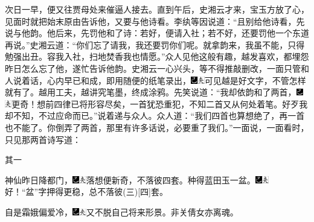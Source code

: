 次日一早，便又往贾母处来催逼人接去。直到午后，史湘云才来，宝玉方放了心，见面时就把始末原由告诉他，又要与他诗看。李纨等因说道：``且别给他诗看，先说与他韵。他后来，先罚他和了诗：若好，便请入社；若不好，还要罚他一个东道再说。''史湘云道：``你们忘了请我，我还要罚你们呢。就拿韵来，我虽不能，只得勉强出丑。容我入社，扫地焚香我也情愿。''众人见他这般有趣，越发喜欢，都埋怨昨日怎么忘了他，遂忙告诉他韵。史湘云一心兴头，等不得推敲删改，一面只管和人说着话，心内早已和成，即用随便的纸笔录出，{\includegraphics[width=3mm]{../Images/00003}\includegraphics[width=3mm]{../Images/00012}\footnotesize \kaishu 可见越是好文字，不管怎样就有了。越用工夫，越讲究笔墨，终成涂鸦。}先笑说道：``我却依韵和了两首，{\includegraphics[width=3mm]{../Images/00003}\includegraphics[width=3mm]{../Images/00012}\footnotesize \kaishu 更奇！想前四律已将形容尽矣，一首犹恐重犯，不知二首又从何处着笔。}好歹我却不知，不过应命而已。''说着递与众人。众人道：``我们四首也算想绝了，再一首也不能了。你倒弄了两首，那里有许多话说，必要重了我们。''一面说，一面看时，只见那两首诗写道：

其一

神仙昨日降都门，{\includegraphics[width=3mm]{../Images/00003}\includegraphics[width=3mm]{../Images/00012}\footnotesize \kaishu 落想便新奇，不落彼四套。}种得蓝田玉一盆。{\includegraphics[width=3mm]{../Images/00003}\includegraphics[width=3mm]{../Images/00012}\footnotesize \kaishu 好！``盆''字押得更稳，总不落彼{(三)}{[}四{]}套。}

自是霜娥偏爱冷，{\includegraphics[width=3mm]{../Images/00003}\includegraphics[width=3mm]{../Images/00012}\footnotesize \kaishu 又不脱自己将来形景。}非关倩女亦离魂。


